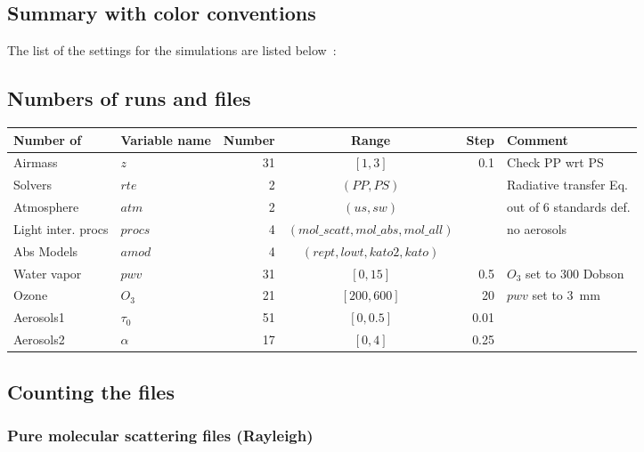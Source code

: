 \documentclass[a4paper]{article}
\begin{document}
\subsection{Summary with color conventions}
The list of the settings for the simulations are listed below~:

\subsection{Numbers of runs and files}

\begin{table}[h]
{\small
\begin{tabular} {|l|l|r|c|r|l|}  \hline\hline
Number of & Variable name & Number & Range & Step & Comment \\ \hline\hline
Airmass    &   $z$                 &     31     & $[1,3]$ & 0.1   & Check PP wrt PS \\
Solvers     & $rte$             &       2      & $(PP,PS)$ &    &  Radiative transfer Eq. \\
Atmosphere &  $atm$       &     2        &  $(us,sw)$ &   &  out of 6 standards def.\\
Light inter. procs    &  $procs$    &   4          & $(mol\_scatt,mol\_abs,mol\_all)$ & & no aerosols \\
Abs Models  & $amod$  & 4 & $(rept,lowt,kato2,kato)$ & &  \\
Water vapor  & $pwv$    & 31 & $[0,15]$ & 0.5  & $O_3$ set to 300 Dobson \\
Ozone        & $O_3$      & 21  & $[200,600]$ & 20 & $pwv$ set to 3~mm \\ \hline
Aerosols1     &  $\tau_0$  & 51  & $[0,0.5]$   & 0.01 &  \\
Aerosols2     & $\alpha$  &  17 & $[0,4]$ & 0.25 &  \\ \hline 
\hline
\end{tabular}
}
\end{table}



\subsection{Counting the files}

\subsubsection{Pure molecular scattering files (Rayleigh)}
\end{document}
